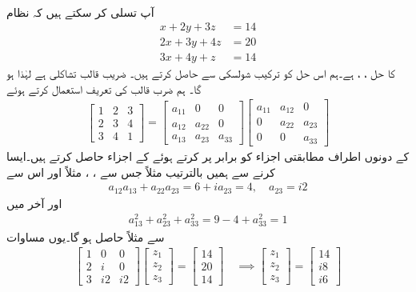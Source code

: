 \quad {}\\
آپ تسلی کر سکتے ہیں کہ نظام
\begin{align*}
x+2y+3z&=14\\
2x+3y+4z&=20\\
3x+4y+z&=14
\end{align*}
کا حل ، ،  ہے۔ہم اس حل کو ترکیب شولسکی سے حاصل کرتے ہیں۔ ضریب  قالب تشاکلی ہے لہٰذا   ہو گا۔ ہم ضرب قالب کی تعریف استعمال کرتے ہوئے
\begin{align*}
\begin{bmatrix}
1&2&3\\
2&3&4\\
3&4&1
\end{bmatrix}=
\begin{bmatrix}
a_{11}&0&0\\
a_{12}&a_{22}&0\\
a_{13}&a_{23}&a_{33}
\end{bmatrix}
\begin{bmatrix}
a_{11}&a_{12}&0\\
0&a_{22}&a_{23}\\
0&0&a_{33}
\end{bmatrix}
\end{align*}
کے دونوں اطراف مطابقتی اجزاء کو برابر پر کرتے ہوئے   کے اجزاء حاصل کرتے ہیں۔ایسا کرنے سے ہمیں  بالترتیب  مثلاً  جس سے ، ،  مثلاً
  اور اس سے
\begin{align*}
a_{12}a_{13}+a_{22}a_{23}=6+ia_{23}=4,\quad a_{23}=i2
\end{align*}
اور آخر میں
\begin{align*}
a^2_{13}+a^2_{23}+a^2_{33}=9-4+a^2_{33}=1
\end{align*}
سے مثلاً  حاصل ہو گا۔یوں مساوات 
\begin{align*}
\begin{bmatrix}
1&0&0\\
2&i&0\\
3&i2&i2
\end{bmatrix}
\begin{bmatrix}
z_1\\
z_2\\
z_3
\end{bmatrix}=
\begin{bmatrix}
14\\
20\\
14
\end{bmatrix}\quad\implies
\begin{bmatrix}
z_1\\
z_2\\
z_3
\end{bmatrix}=
\begin{bmatrix}
14\\
i8\\
i6
\end{bmatrix}
\end{align*}
